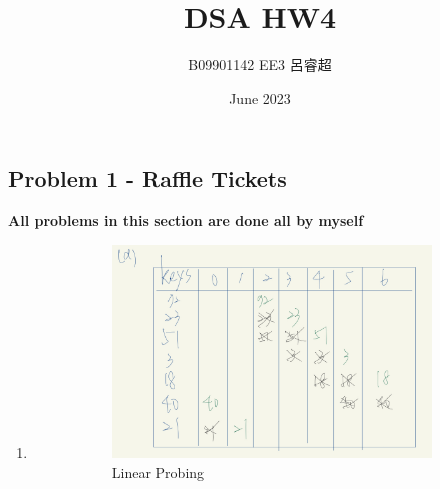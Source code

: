 \documentclass{article}
\title{DSA HW4}
\author{B09901142 EE3 呂睿超}
\date{June 2023}
\begin{document}
\begin{CJK*}{UTF8}{bsmi}
\maketitle

\section{Problem 1 - Raffle Tickets}
\textbf{All problems in this section are done all by myself}

\begin{enumerate}

    \item \begin{enumerate}

    \begin{figure}[H]
        \centering
    \begin{subfigure}{.55\textwidth}
      \centering
      \includegraphics[width=1\linewidth]{IMG_0318.jpg}
      \caption{Linear Probing}
      \label{fig:sub1}
    \end{subfigure}%
    \begin{subfigure}{.5\textwidth}
      \centering

\end{subfigure}
\end{figure}
\end{enumerate}
\end{enumerate}
\end{CJK*}
\end{document}
